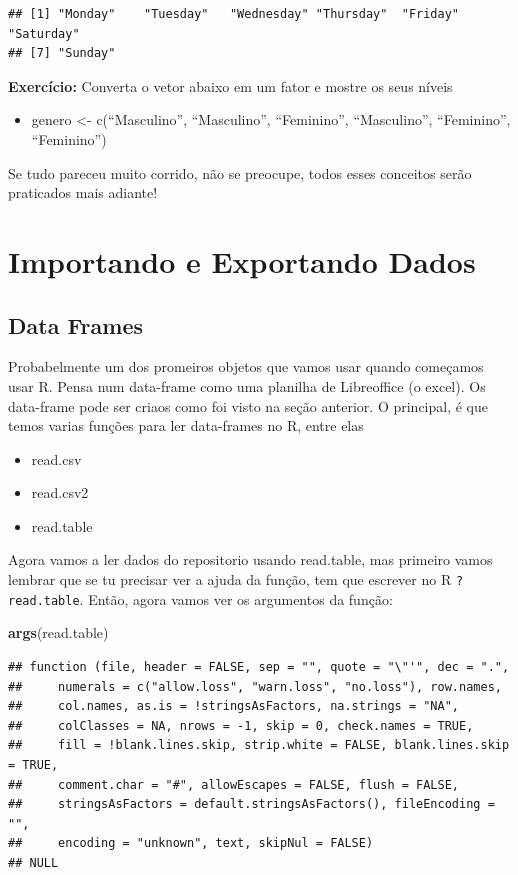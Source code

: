 \documentclass[]{book}
\newenvironment{Shaded}{\begin{snugshade}}{\end{snugshade}}
\newcommand{\KeywordTok}[1]{\textcolor[rgb]{0.13,0.29,0.53}{\textbf{#1}}}
\newcommand{\NormalTok}[1]{#1}
\providecommand{\tightlist}{%
  \setlength{\itemsep}{0pt}\setlength{\parskip}{0pt}}
\theoremstyle{definition}
\theoremstyle{definition}
\theoremstyle{definition}
\theoremstyle{remark}
\begin{document}
\begin{verbatim}
## [1] "Monday"    "Tuesday"   "Wednesday" "Thursday"  "Friday"    "Saturday" 
## [7] "Sunday"
\end{verbatim}

\textbf{Exercício:} Converta o vetor abaixo em um fator e mostre os seus
níveis

\begin{itemize}
\tightlist
\item
  genero \textless{}- c(``Masculino'', ``Masculino'', ``Feminino'',
  ``Masculino'', ``Feminino'', ``Feminino'')
\end{itemize}

Se tudo pareceu muito corrido, não se preocupe, todos esses conceitos
serão praticados mais adiante!

\chapter{Importando e Exportando
Dados}\label{importando-e-exportando-dados}

\section{Data Frames}\label{data-frames}

Probabelmente um dos promeiros objetos que vamos usar quando começamos
usar R. Pensa num data-frame como uma planilha de Libreoffice (o excel).
Os data-frame pode ser criaos como foi visto na seção anterior. O
principal, é que temos varias funções para ler data-frames no R, entre
elas

\begin{itemize}
\tightlist
\item
  read.csv
\item
  read.csv2
\item
  read.table
\end{itemize}

Agora vamos a ler dados do repositorio usando read.table, mas primeiro
vamos lembrar que se tu precisar ver a ajuda da função, tem que escrever
no R \texttt{?read.table}. Então, agora vamos ver os argumentos da
função:

\begin{Shaded}
\begin{Highlighting}[]
\KeywordTok{args}\NormalTok{(read.table)}
\end{Highlighting}
\end{Shaded}

\begin{verbatim}
## function (file, header = FALSE, sep = "", quote = "\"'", dec = ".", 
##     numerals = c("allow.loss", "warn.loss", "no.loss"), row.names, 
##     col.names, as.is = !stringsAsFactors, na.strings = "NA", 
##     colClasses = NA, nrows = -1, skip = 0, check.names = TRUE, 
##     fill = !blank.lines.skip, strip.white = FALSE, blank.lines.skip = TRUE, 
##     comment.char = "#", allowEscapes = FALSE, flush = FALSE, 
##     stringsAsFactors = default.stringsAsFactors(), fileEncoding = "", 
##     encoding = "unknown", text, skipNul = FALSE) 
## NULL
\end{verbatim}
\end{document}
